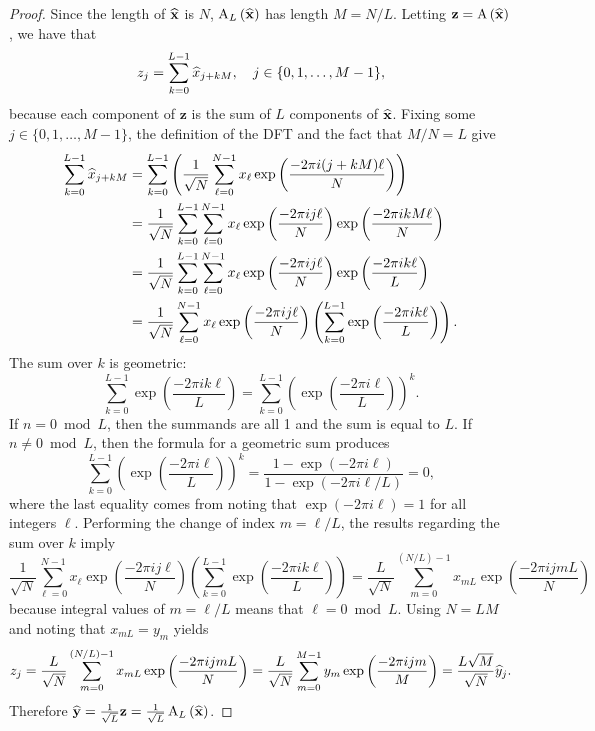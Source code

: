 \begin{proof}
Since the length of $\widehat{\mathbf{x}}$ is $N$, $\operatorname{A}_L\left(\widehat{\mathbf{x}}\right)$ has length $M = N/L$. Letting $\mathbf{z} = \operatorname{A}\left(\widehat{\mathbf{x}}\right)$, we have that
\[z_j = \sum_{k=0}^{L-1}\widehat{x}_{j+kM}, \quad j\in\{0,1,\ldots,M-1\},\]
because each component of $\mathbf{z}$ is the sum of $L$ components of $\widehat{\mathbf{x}}$. Fixing some $j\in\{0,1,\ldots,M-1\}$, the definition of the DFT and the fact that $M/N = L$ give
\begin{align*}
\sum_{k=0}^{L-1}\widehat{x}_{j+kM} &= \sum_{k=0}^{L-1} \left(\frac{1}{\sqrt{N}}\sum_{\ell=0}^{N-1} x_{\ell}\exp\left(\frac{-2\pi{i}(j+kM)\ell}{N}\right)\right) \\
&= \frac{1}{\sqrt{N}} \sum_{k=0}^{L-1} \sum_{\ell=0}^{N-1} x_{\ell}\exp\left(\frac{-2\pi{ij\ell}}{N}\right)\exp\left(\frac{-2\pi{ikM\ell}}{N}\right) \\
&= \frac{1}{\sqrt{N}} \sum_{k=0}^{L-1} \sum_{\ell=0}^{N-1} x_{\ell}\exp\left(\frac{-2\pi{ij\ell}}{N}\right)\exp\left(\frac{-2\pi{ik\ell}}{L}\right) \\
&= \frac{1}{\sqrt{N}} \sum_{\ell=0}^{N-1} x_{\ell} \exp\left(\frac{-2\pi{ij\ell}}{N}\right) \left(\sum_{k=0}^{L-1} \exp\left(\frac{-2\pi{ik\ell}}{L}\right)\right).
\end{align*}
The sum over $k$ is geometric:
\[\sum_{k=0}^{L-1} \exp\left(\frac{-2\pi{ik\ell}}{L}\right) = \sum_{k=0}^{L-1} \left(\exp\left(\frac{-2\pi{i\ell}}{L}\right)\right)^k.\]
If $n = 0 \bmod L$, then the summands are all 1 and the sum is equal to $L$. If $n \neq 0 \bmod L$, then the formula for a geometric sum produces
\[\sum_{k=0}^{L-1} \left(\exp\left(\frac{-2\pi{i\ell}}{L}\right)\right)^k = \frac{1-\exp(-2\pi{i\ell})}{1-\exp(-2\pi{i\ell/L})} = 0,\]
where the last equality comes from noting that $\exp(-2\pi{i\ell}) = 1$ for all integers $\ell$. Performing the change of index $m = \ell/L$, the results regarding the sum over $k$ imply
\[\frac{1}{\sqrt{N}} \sum_{\ell=0}^{N-1} x_{\ell} \exp\left(\frac{-2\pi{ij\ell}}{N}\right) \left(\sum_{k=0}^{L-1} \exp\left(\frac{-2\pi{ik\ell}}{L}\right)\right) = \frac{L}{\sqrt{N}} \sum_{m=0}^{(N/L)-1} x_{mL} \exp\left(\frac{-2\pi{ijmL}}{N}\right)\]
because integral values of $m = \ell/L$ means that $\ell = 0 \bmod L$. Using $N = LM$ and noting that $x_{mL} = y_m$ yields
\[z_j = \frac{L}{\sqrt{N}} \sum_{m=0}^{(N/L)-1} x_{mL} \exp\left(\frac{-2\pi{ijmL}}{N}\right) = \frac{L}{\sqrt{N}} \sum_{m=0}^{M-1} y_m \exp\left(\frac{-2\pi{ijm}}{M}\right) = \frac{L\sqrt{M}}{\sqrt{N}} \widehat{y}_j.\]
Therefore $\widehat{\mathbf{y}} = \frac{1}{\sqrt{L}}\mathbf{z} = \frac{1}{\sqrt{L}}\operatorname{A}_L\left(\widehat{\mathbf{x}}\right)$.
\end{proof}
